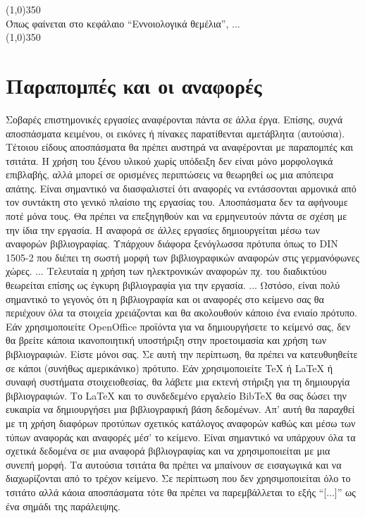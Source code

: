 \begin{center}
\line(1,0){350}\\
Όπως φαίνεται στο κεφάλαιο ``Εννοιολογικά θεμέλια'', ...\\
\line(1,0){350}\\
\end{center}

\section{Παραπομπές και οι αναφορές}
Σοβαρές επιστημονικές εργασίες αναφέρονται πάντα σε άλλα έργα. Επίσης, συχνά αποσπάσματα κειμένου, οι εικόνες ή πίνακες παρατίθενται αμετάβλητα (αυτούσια). Τέτοιου είδους αποσπάσματα θα πρέπει αυστηρά να αναφέρονται με παραπομπές και τσιτάτα. Η χρήση του ξένου υλικού χωρίς υπόδειξη δεν είναι μόνο μορφολογικά επιβλαβής, αλλά μπορεί σε ορισμένες περιπτώσεις να θεωρηθεί ως μια απόπειρα απάτης.
Είναι σημαντικό να διασφαλιστεί ότι αναφορές να εντάσσονται αρμονικά από τον συντάκτη στο γενικό πλαίσιο της εργασίας του. Αποσπάσματα δεν τα αφήνουμε ποτέ μόνα τους. Θα πρέπει να επεξηγηθούν και να ερμηνευτούν πάντα σε σχέση με την ίδια την εργασία. 
Η αναφορά σε άλλες εργασίες δημιουργείται μέσω  των αναφορών βιβλιογραφίας. 
Υπάρχουν διάφορα ξενόγλωσσα πρότυπα όπως το DIN 1505-2 που διέπει τη σωστή μορφή των βιβλιογραφικών αναφορών στις γερμανόφωνες χώρες. ... Τελευταία η χρήση των ηλεκτρονικών αναφορών πχ. του διαδικτύου θεωρείται επίσης ως έγκυρη βιβλιογραφία για την εργασία. ... Ωστόσο, είναι πολύ σημαντικό το γεγονός ότι η βιβλιογραφία και οι αναφορές στο κείμενο σας θα περιέχουν όλα τα στοιχεία χρειάζονται και θα ακολουθούν κάποιο ένα ενιαίο πρότυπο.
Εάν χρησιμοποιείτε OpenOffice προϊόντα για να δημιουργήσετε το κείμενό σας, δεν θα βρείτε κάποια ικανοποιητική υποστήριξη στην προετοιμασία και χρήση των βιβλιογραφιών. Είστε μόνοι σας. Σε αυτή την περίπτωση, θα πρέπει να κατευθυηθείτε σε κάποι (συνήθως αμερικάνικο) πρότυπο. Εάν χρησιμοποιείτε \TeX{} ή \LaTeX{} ή συναφή συστήματα στοιχειοθεσίας, θα λάβετε μια εκτενή στήριξη για τη δημιουργία βιβλιογραφιών. Το \LaTeX{} και το συνδεδεμένο εργαλείο Bib\TeX{} θα σας δώσει την ευκαιρία να δημιουργήσει μια βιβλιογραφική βάση δεδομένων. Απ' αυτή θα παραχθεί με τη χρήση διαφόρων προτύπων σχετικός κατάλογος αναφορών καθώς και μέσω των  τύπων αναφοράς και αναφορές μέσ' το κείμενο. Είναι σημαντικό να υπάρχουν όλα τα σχετικά δεδομένα σε μια αναφορά βιβλιογραφίας και να χρησιμοποιείται με μια συνεπή μορφή.
Τα αυτούσια τσιτάτα θα πρέπει να μπαίνουν σε εισαγωγικά και να διαχωρίζονται από το τρέχον κείμενο. Σε περίπτωση που δεν χρησιμοποιείται όλο το τσιτάτο αλλά κάοια αποσπάσματα τότε θα πρέπει να παρεμβάλλεται το εξής ``[...]'' ως ένα σημάδι της παράλειψης.

